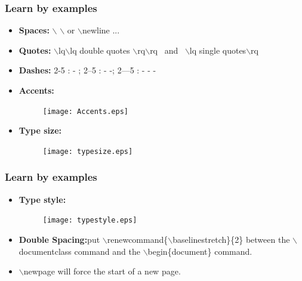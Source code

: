 \documentclass [9pt] {beamer}
\begin{document}
\begin{frame}\frametitle{Learn by examples}
\rm
\fontsize{9pt}{11pt}\selectfont
\begin{itemize}
  \item \textbf{Spaces:} $\backslash$ $\backslash$ or $\backslash$newline ...  \\[.30cm]
  \item \textbf{Quotes:} $\backslash$lq$\backslash$lq double quotes $\backslash$rq$\backslash$rq \ and \ $\backslash$lq single quotes$\backslash$rq \\[.30cm]
      \item \textbf{Dashes:} 2-5 : - ; 2--5 : - -; 2---5 : - - -
      \item \textbf{Accents:}
      \begin{figure}[h!]
     \texttt{[image: Accents.eps]}
\end{figure}
\item \textbf{Type size:}
      \begin{figure}[h!]
     \texttt{[image: typesize.eps]}
\end{figure}
\end{itemize}
\end{frame}

\begin{frame}\frametitle{Learn by examples}
\rm
\fontsize{9pt}{11pt}\selectfont
\begin{itemize}
     \item \textbf{Type style:}
      \begin{figure}[h!]
     \texttt{[image: typestyle.eps]}
\end{figure}
 \item \textbf{Double Spacing:}put \textcolor[rgb]{0.98,0.00,0.00}{$\backslash$renewcommand\{$\backslash$baselinestretch\}\{2\}} between the \textcolor[rgb]{0.98,0.00,0.00}{$\backslash$documentclass} command and the \textcolor[rgb]{0.98,0.00,0.00}{$\backslash$begin\{document\}} command. \\[.30cm]
\item \textcolor[rgb]{0.98,0.00,0.00}{$\backslash$newpage }will force the start of a new page.
\end{itemize}
\end{frame}
\end{document}
